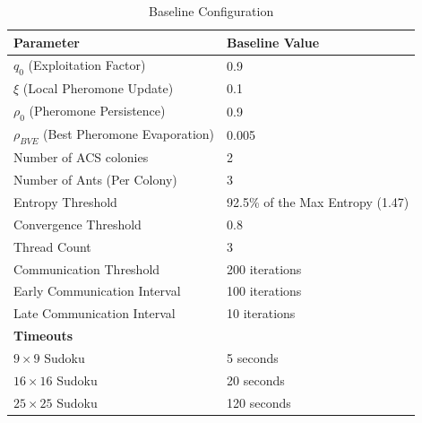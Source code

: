 \begin{table}[H]
    \caption{Baseline Configuration}
    \centering
    \renewcommand{\arraystretch}{1.2} 
    \setlength{\tabcolsep}{10pt} 
    \begin{tabular}{|l|l|}
    \hline
    \textbf{Parameter}                          & \textbf{Baseline Value}                               \\ \hline
    $q_0$ (Exploitation Factor)                 & 0.9                                        \\ \hline
    $\xi$ (Local Pheromone Update)              & 0.1                                         \\ \hline
    $\rho_0$ (Pheromone Persistence)            & 0.9                                        \\ \hline
    $\rho_{BVE}$ (Best Pheromone Evaporation)   & 0.005                                                                            \\ \hline
    Number of ACS colonies                      & 2                                          \\ \hline
    Number of Ants (Per Colony)                 & 3                                           \\ \hline
    Entropy Threshold                           & 92.5\% of the Max Entropy (1.47)                              \\ \hline
    Convergence Threshold                     & 0.8                                                      \\ \hline
    Thread Count                                & 3                                         \\ \hline
    Communication Threshold                     & 200 iterations                             \\ \hline
    Early Communication Interval                & 100 iterations                           \\ \hline
    Late Communication Interval                 & 10 iterations                              \\ \hline
    \textbf{Timeouts}                           &                                                       \\ \hline
    $9 \times 9$ Sudoku                         & 5 seconds                                             \\ \hline
    $16 \times 16$ Sudoku                       & 20 seconds                                            \\ \hline
    $25 \times 25$ Sudoku                       & 120 seconds \\ \hline
    \end{tabular}
    \label{tab:baseline_parameters}
\end{table}

